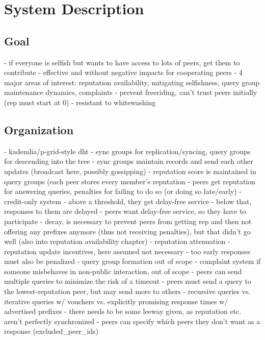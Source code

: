 \chapter{System Description}
\section{Goal}
- if everyone is selfish but wants to have access to lots of peers, get them to
  contribute
- effective and without negative impacts for cooperating peers
- 4 major areas of interest: reputation availability, mitigating selfishness,
  query group maintenance dynamics, complaints
- prevent freeriding, can't trust peers initially (rep must start at 0)
- resistant to whitewashing

\section{Organization}
- kademlia/p-grid-style dht
- sync groups for replication/syncing, query groups for descending into the tree
- sync groups maintain records and send each other updates (broadcast here,
  possibly gossipping)
- reputation score is maintained in query groups (each peer stores every
  member's reputation
- peers get reputation for answering queries, penalties for failing to do so (or
  doing so late/early)
- credit-only system
- above a threshold, they get delay-free service
- below that, responses to them are delayed
- peers want delay-free service, so they have to participate
- decay, is necessary to prevent peers from getting rep and then not offering
  any prefixes anymore (thus not receiving penalties), but that didn't go well
  (also into reputation availability chapter)
- reputation attenuation
- reputation update incentives, here assumed not necessary
- too early responses must also be penalized
- query group formation out of scope
- complaint system if someone misbehaves in non-public interaction, out of scope
- peers can send multiple queries to minimize the risk of a timeout
- peers must send a query to the lowest-reputation peer, but may send more to
  others
- recursive queries vs. iterative queries w/ vouchers vs. explicitly promising
  response times w/ advertised prefixes
- there needs to be some leeway given, as reputation etc. aren't perfectly
  synchronized
- peers can specify which peers they don't want as a response
  (excluded\_peer\_ids)
